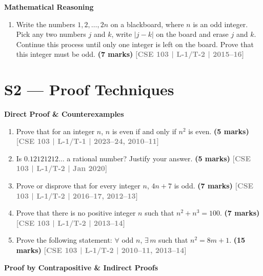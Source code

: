 \documentclass[12pt,a3paper]{article}
\newcommand{\yr}[1]{\hfill\textcolor{gray}{\small\textbf{[#1]}}}
\newcommand{\mk}[1]{\textcolor{orange!70!black}{\small\textbf{(#1 marks)}}}
\newcommand{\subtopic}[2]{%
  \vspace{10pt}
  \noindent\begin{tcolorbox}[colback=#1!8,colframe=#1,boxrule=0.6pt,arc=4pt,
    left=6pt,right=6pt,top=4pt,bottom=4pt]
    \small\bfseries\textcolor{#1}{#2}
  \end{tcolorbox}
  \vspace{2pt}
}
\begin{document}
\subtopic{cA}{Mathematical Reasoning}
\label{sub:s1-reasoning}

\begin{enumerate}

\item Write the numbers $1, 2, \ldots, 2n$ on a blackboard, where $n$ is an odd integer. Pick any two numbers $j$ and $k$, write $|j - k|$ on the board and erase $j$ and $k$. Continue this process until only one integer is left on the board. Prove that this integer must be odd.
\mk{7} \yr{CSE 103 | L-1/T-2 | 2015--16}

\end{enumerate}

\section{S2 --- Proof Techniques}
\label{sec:S2}

\subtopic{cA}{Direct Proof \& Counterexamples}
\label{sub:s2-direct}

\begin{enumerate}

\item Prove that for an integer $n$, $n$ is even if and only if $n^2$ is even.
\mk{5} \yr{CSE 103 | L-1/T-1 | 2023--24, 2010--11}

\item Is $0.12121212\ldots$ a rational number? Justify your answer.
\mk{5} \yr{CSE 103 | L-1/T-2 | Jan 2020}

\item Prove or disprove that for every integer $n$, $4n + 7$ is odd.
\mk{7} \yr{CSE 103 | L-1/T-2 | 2016--17, 2012--13}

\item Prove that there is no positive integer $n$ such that $n^2 + n^3 = 100$.
\mk{7} \yr{CSE 103 | L-1/T-2 | 2013--14}

\item Prove the following statement: $\forall$ odd $n$, $\exists\, m$ such that $n^2 = 8m + 1$.
\mk{15} \yr{CSE 103 | L-1/T-2 | 2010--11, 2013--14} 

\end{enumerate}


\subtopic{cA}{Proof by Contrapositive \& Indirect Proofs}
\label{sub:s2-contrapositive}
\end{document}
